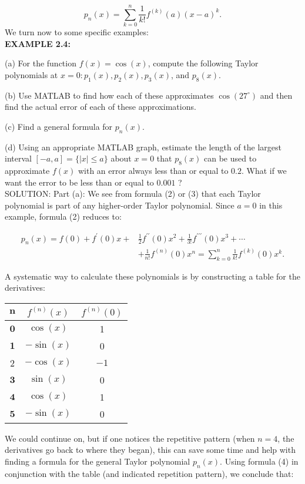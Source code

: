 \documentclass[../main.tex]{subfiles}
\begin{document}
\begin{equation}\label{eq:3} \tag{3}
p_{n}(x)=\sum_{k=0}^{n} \frac{1}{k !} f^{(k)}(a)(x-a)^{k} .
\end{equation}
We turn now to some specific examples:\\

\textbf{EXAMPLE 2.4: }

 (a) For the function $f(x)=\cos (x)$, compute the following Taylor polynomials at $x=0: p_{1}(x), p_{2}(x), p_{3}(x)$, and $p_{8}(x)$.

(b) Use MATLAB to find how each of these approximates $\cos \left(27^{\circ}\right)$ and then find the actual error of each of these approximations.

(c) Find a general formula for $p_{n}(x)$.

(d) Using an appropriate MATLAB graph, estimate the length of the largest interval $[-a, a]=\{|x| \leq a\}$ about $x=0$ that $p_{8}(x)$ can be used to approximate $f(x)$ with an error always less than or equal to $0.2$. What if we want the error to be less than or equal to $0.001$ ? \\

SOLUTION: Part (a): We see from formula (2) or (3) that each Taylor polynomial is part of any higher-order Taylor polynomial. Since $a=0$ in this example, formula (2) reduces to:

\begin{equation}\label{eq:4} \tag{4}
\begin{aligned}
p_{n}(x)=f(0)+f^{\prime}(0) x+& \frac{1}{2} f^{\prime \prime}(0) x^{2}+\frac{1}{3 !} f^{\prime \prime \prime}(0) x^{3}+\cdots \\
&+\frac{1}{n !} f^{(n)}(0) x^{n}=\sum_{k=0}^{n} \frac{1}{k !} f^{(k)}(0) x^{k} .
\end{aligned}
\end{equation}

A systematic way to calculate these polynomials is by constructing a table for the derivatives:

\begin{center}
\begin{tabular}{|c|c|c|}
\hline
$\mathbf{n}$ & $f^{(n)}(x)$ & $f^{(n)}(0)$ \\
\hline
$\mathbf{0}$ & $\cos (x)$ & 1 \\
\hline
$\mathbf{1}$ & $-\sin (x)$ & 0 \\
\hline
2 & $-\cos (x)$ & $-1$ \\
\hline
$\mathbf{3}$ & $\sin (x)$ & 0 \\
\hline
$\mathbf{4}$ & $\cos (x)$ & 1 \\
\hline
$\mathbf{5}$ & $-\sin (x)$ & 0 \\
\hline
\end{tabular}
\end{center}
We could continue on, but if one notices the repetitive pattern (when $n=4$, the derivatives go back to where they began), this can save some time and help with finding a formula for the general Taylor polynomial $p_{n}(x)$. Using formula (4) in conjunction with the table (and indicated repetition pattern), we conclude that:
\end{document}
